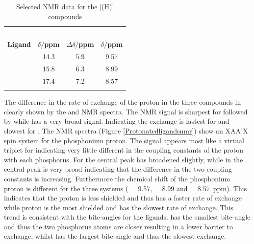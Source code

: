 {\begin{table}[htbp]
\caption[Selected NMR data for [\tBuxantphos(H){]}]{Selected NMR data for the [\tBuxantphos(H){]} compounds}
\label{table:protonatedNMR}
\small
\begin{center}
\begin{tabular}{l c c c}
	\toprule{}
	~~ & \multicolumn{2}{c}{\bfseries{\phosphorus}} & \bfseries{\proton}\\
	\cmidrule(lr){2-3} \cmidrule(lr){4-4}
	\bfseries{Ligand}&\bfseries{$\delta/$ppm}&\bfseries{$\Delta\delta/$ppm}& \bfseries{\ce{H+}$\delta/$ppm}\\
	\midrule{}
	\tBuSixantphos		& 14.3	& 5.9 	& 9.57 \\
	\tBuThixantphos 	& 15.8	& 6.3		& 8.99 \\
	\tBuXantphos		& 17.4	& 7.2		& 8.57 \\
	\bottomrule{}
\end{tabular}
\end{center}
\end{table}

The difference in the rate of exchange of the proton in the three compounds in clearly shown by the \phosphorus{} and \proton{} NMR spectra.  The \phosphorus{} NMR signal is sharpest for \tBusixantphos{} followed by \tButhixantphos{} while \tBuxantphos has a very broad signal.  Indicating the exchange is fastest for \tBusixantphos{} and slowest for \tBuxantphos{}.  The \proton{} NMR spectra (Figure \ref{Protonatedligandsnmr}) show an XAA'X spin system for the phosphonium proton.  The signal appears most like a virtual triplet for \tBusixantphos{} indicating very little different in the coupling constants of the proton with each phosphorus.  For \tButhixantphos{} the central peak has broadened slightly, while in \tBuxantphos{} the central peak is very broad indicating that the difference in the two coupling constants is increasing.  Furthermore the chemical shift of the phosphonium proton is different  for the three systems (\tBusixantphos{} = 9.57, \tButhixantphos{} = 8.99 and \tBuxantphos{} = 8.57~ppm).  This indicates that the \tBusixantphos{} proton is less shielded and thus has a faster rate of exchange while \tBuxantphos{} proton is the most shielded and has the slowest rate of exchange.  This trend is consistent with the bite-angles for the ligands.  \tBusixantphos{} has the smallest bite-angle and thus the two phosphorus atoms are closer resulting in a lower barrier to exchange, whilst \tButhixantphos{} has the largest bite-angle and thus the slowest exchange.  

}
